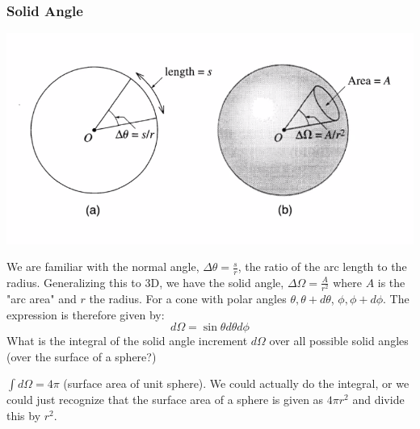 \documentclass[../PHYS306Notes.tex]{subfiles}
\begin{document}
\subsubsection{Solid Angle}
\begin{center}
    \includegraphics[scale=0.5]{Lecture-27/l27-img7.png}
\end{center}
We are familiar with the normal angle, $\Delta \theta = \frac{s}{r}$, the ratio of the arc length to the radius. Generalizing this to 3D, we have the solid angle, $\Delta \Omega = \frac{A}{r^2}$ where $A$ is the "arc area" and $r$ the radius. For a cone with polar angles $\theta, \theta + d\theta$, $\phi, \phi + d\phi$. The expression is therefore given by:
\[d\Omega = \sin\theta d\theta d\phi\]
What is the integral of the solid angle increment $d\Omega$ over all possible solid angles (over the surface of a sphere?)
\begin{s}
$\int d\Omega = 4\pi$ (surface area of unit sphere). We could actually do the integral, or we could just recognize that the surface area of a sphere is given as $4\pi r^2$ and divide this by $r^2$. 
\end{s}
\end{document}
